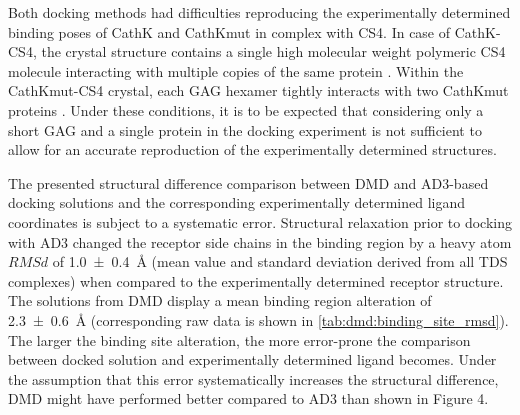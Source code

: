 Both docking methods had difficulties reproducing the experimentally determined
binding poses of CathK and CathKmut in complex with CS4. In case of CathK-CS4,
the crystal structure contains a single high molecular weight polymeric CS4
molecule interacting with multiple copies of the same protein
\cite{catK_cs4_crystal_structure_2008}. Within the CathKmut-CS4 crystal, each
GAG hexamer tightly interacts with two CathKmut proteins
\cite{catKmut_cs4_crystal_2011}. Under these conditions, it is to be expected
that considering only a short GAG and a single protein in the docking experiment
is not sufficient to allow for an accurate reproduction of the experimentally
determined structures.

The presented structural difference comparison between DMD and AD3-based docking
solutions and the corresponding experimentally determined ligand coordinates is
subject to a systematic error. Structural relaxation prior to docking with AD3
changed the receptor side chains in the binding region by a heavy atom $RMSd$ of
\SI{1.0 +- 0.4}{\angstrom} (mean value and standard deviation derived from all
TDS complexes) when compared to the experimentally determined receptor
structure. The solutions from DMD display a mean binding region alteration of
\SI{2.3 +- 0.6}{\angstrom} (corresponding raw data is shown in
\cref{tab:dmd:binding_site_rmsd}). The larger the binding site alteration, the
more error-prone the comparison between docked solution and experimentally
determined ligand becomes. Under the assumption that this error systematically
increases the structural difference, DMD might have performed better compared to
AD3 than shown in Figure 4.


